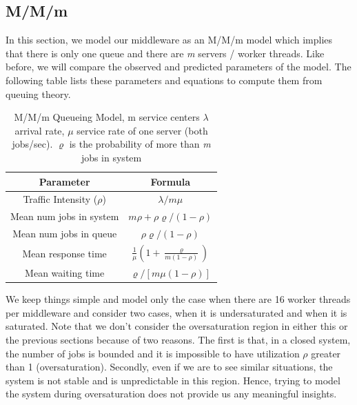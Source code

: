 \documentclass[11pt,a4paper]{article}
\newcommand\instructions[1]{\textcolor{blue}{Instructions: #1}}
\begin{document}
\subsection{M/M/m}


In this section, we model our middleware as an M/M/m model which implies that there is only one queue and there are \textit{m} servers / worker threads. Like before, we will compare the observed and predicted parameters of the model. The following table lists these parameters and equations to compute them from queuing theory.

\begin{table}[H]
	\centering
	\caption{M/M/m Queueing Model, m service centers $\lambda$ arrival rate, $\mu$ service rate of one server (both jobs/sec). $\varrho$ is the probability of more than \textit{m} jobs in system}
	\begin{tabular}{|c|c|}
		\hline
		\multicolumn{1}{|c|}{Parameter} & \multicolumn{1}{c|}{Formula} \\ \hline
		Traffic Intensity ($\rho$) & $\lambda/m\mu$ \\ \hline
		Mean num jobs in system    & $m\rho + \rho \varrho / (1 - \rho)$ \\ \hline
		Mean num jobs in queue     & $\rho \varrho / (1 - \rho)$ \\ \hline
		Mean response time         & $\frac{1}{\mu} (1 + \frac{\varrho}{m(1 - \rho)})$ \\ \hline
		Mean waiting time          & $\varrho/ [m\mu(1 - \rho)]$ \\ \hline
	\end{tabular}
	\label{}
\end{table}

 We keep things simple and model only the case when there are 16 worker threads per middleware and consider two cases, when it is undersaturated and when it is saturated. Note that we don't consider the oversaturation region in either this or the previous sections because of two reasons. The first is that, in a closed system, the number of jobs is bounded and it is impossible to have utilization $\rho$ greater than 1 (oversaturation). Secondly, even if we are to see similar situations, the system is not stable and is unpredictable in this region. Hence, trying to model the system during oversaturation does not provide us any meaningful insights.
 
\end{document}
